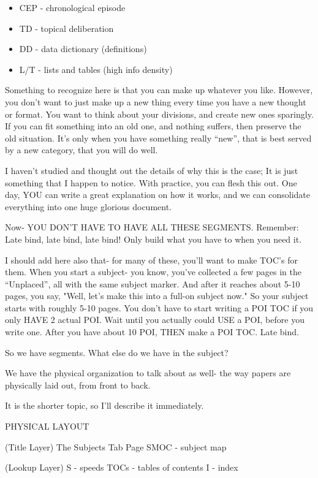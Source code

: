 \documentclass[oneside]{book}
\begin{document}
\begin{itemize}
\item CEP    - chronological episode
\item TD     - topical deliberation
\item DD     - data dictionary (definitions)
\item L/T    - lists and tables (high info density)
\end{itemize}

Something to recognize here is that you can make up whatever you
like. However, you don't want to just make up a new thing every time
you have a new thought or format. You want to think about your
divisions, and create new ones sparingly. If you can fit something
into an old one, and nothing suffers, then preserve the old
situation. It's only when you have something really ``new'', that is
best served by a new category, that you will do well.

I haven't studied and thought out the details of why this is the case;
It is just something that I happen to notice. With practice, you can
flesh this out. One day, YOU can write a great explanation on how it
works, and we can consolidate everything into one huge glorious
document.

Now- YOU DON'T HAVE TO HAVE ALL THESE SEGMENTS. Remember: Late bind,
late bind, late bind! Only build what you have to when you need it.

I should add here also that- for many of these, you'll want to make
TOC's for them. When you start a subject- you know, you've collected a
few pages in the ``Unplaced'', all with the same subject marker. And
after it reaches about 5-10 pages, you say, "Well, let's make this
into a full-on subject now." So your subject starts with roughly 5-10
pages. You don't have to start writing a POI TOC if you only HAVE 2
actual POI. Wait until you actually could USE a POI, before you write
one. After you have about 10 POI, THEN make a POI TOC. Late bind.

So we have segments. What else do we have in the subject?

We have the physical organization to talk about as well- the way
papers are physically laid out, from front to back.

It is the shorter topic, so I'll describe it immediately.

PHYSICAL LAYOUT

  (Title Layer)
The Subjects Tab Page
SMOC    - subject map

  (Lookup Layer)
S       - speeds
TOCs    - tables of contents
I       - index
\end{document}

